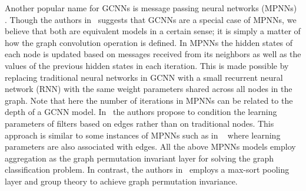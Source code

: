 \documentclass{article}
\begin{document}
Another popular name for GCNNs is message passing neural networks (MPNNs)~\cite{lei2017deriving, gilmer2017neural,dai2016discriminative, garcia2017learning} . Though the authors in~\cite{gilmer2017neural} suggests that GCNNs are a special case  of MPNNs, we believe that both are equivalent models in a certain sense; it is simply a matter of  how the graph convolution operation is defined. In MPNNs the  hidden states of each node  is updated based on messages received from its neighbors as well as  the values of the previous hidden states in each iteration.  %
This is made possible    by replacing traditional neural networks in GCNN with a small recurrent neural network (RNN) with the same weight parameters shared across all nodes in the graph. Note that here the number of iterations in MPNNs can be related to the depth of a GCNN model. In~\cite{simonovsky2017dynamic} the  authors propose to condition the learning parameters of filters  based on edges rather than on traditional nodes. This approach is similar to some instances of MPNNs such as in ~\cite{gilmer2017neural} where learning parameters are also associated with  edges. All the above MPNNs models employ aggregation   as the graph permutation invariant layer for solving the graph classification problem. In contrast, the authors  in~\cite{zhang2018end, kondor2018covariant} employs a max-sort pooling layer and group theory to achieve graph permutation invariance. 



\end{document}
